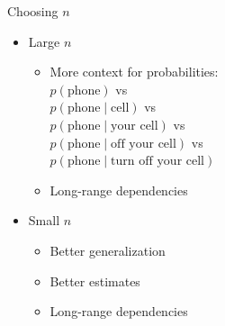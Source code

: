 \documentclass[11pt,letterpaper]{article}
\begin{document}
Choosing $n$
\begin{itemize}
  \item Large $n$
    \begin{itemize}
      \item More context for probabilities: \\ $p(\text{phone})$ vs \\
                                               $p(\text{phone} \mid \text{cell})$ vs \\
                                               $p(\text{phone} \mid \text{your cell})$ vs \\
                                               $p(\text{phone} \mid \text{off your cell})$ vs \\
                                               $p(\text{phone} \mid \text{turn off your cell})$
      \item Long-range dependencies
    \end{itemize}
  \item Small $n$
    \begin{itemize}
      \item Better generalization
      \item Better estimates
      \item Long-range dependencies
    \end{itemize}
\end{itemize}
\end{document}
